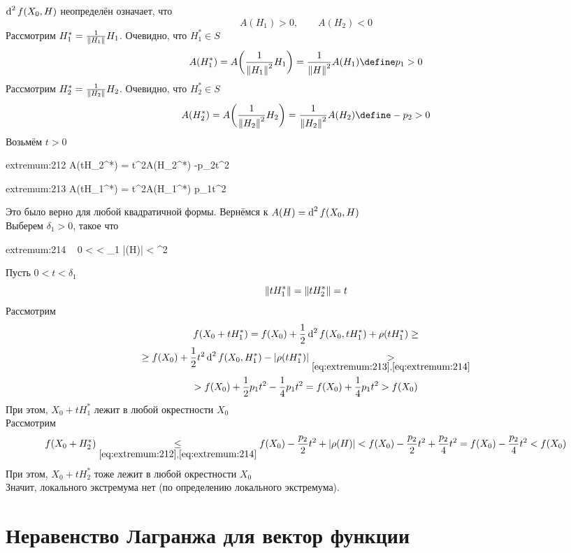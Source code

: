 \begin{eproof}
	\item $ \di[2] f(X_0, H) $ неопределён означает, что
	$$ A(H_1) > 0, \qquad A(H_2) < 0 $$
	Рассмотрим $ H_1^* = \frac1{\norm{H_1}}H_1 $. Очевидно, что $ H_1^* \in S $
	$$ A(H_1^*) = A \bigg( \frac1{\norm{H_1}^2}H_1 \bigg) = \frac1{\norm{H}^2}A(H_1) \define p_1 > 0 $$
	Рассмотрим $ H_2^* = \frac1{\norm{H_2}}H_2 $. Очевидно, что $ H_2^* \in S $
	$$ A(H_2^*) = A \bigg( \frac1{\norm{H_2}^2}H_2 \bigg) = \frac1{\norm{H_2}^2}A(H_2) \define -p_2 > 0 $$
	Возьмём $ t > 0 $
	\begin{equ}{extremum:212}
		A(tH_2^*) = t^2A(H_2^*)  -p_2t^2
	\end{equ}
	\begin{equ}{extremum:213}
		A(tH_1^*) = t^2A(H_1^*)  p_1t^2
	\end{equ}
	Это было верно для любой квадратичной формы. Вернёмся к $ A(H) = \di[2] f(X_0, H) $ \\
	Выберем $ \delta_1 > 0 $, такое что
	\begin{equ}{extremum:214}
		\forall ~ 0 <  < \delta_1 \quad |\rho(H)| <  \min{} \cdot {}^2
	\end{equ}
	Пусть $ 0 < t < \delta_1 $
	$$ \norm{tH_1^*} = \norm{tH_2^*} = t $$
	Рассмотрим
	\begin{multline*}
		f(X_0 + tH_1^*) = f(X_0) + \half \di[2] f(X_0, tH_1^*) + \rho(tH_1^*) \ge \\
		\ge f(X_0) + \half t^2 \di[2] f(X_0, H_1^*) - |\rho(tH_1^*)| \underset{\eref{extremum:213}, \eref{extremum:214}}> \\
		> f(X_0) + \half p_1t^2 - \frac14 p_1t^2 = f(X_0) + \frac14 p_1t^2 > f(X_0)
	\end{multline*}
	При этом, $ X_0 + tH_1^* $ лежит в любой окрестности $ X_0 $ \\
	Рассмотрим
	$$ f(X_0 + H_2^*) \underset{\eref{extremum:212}, \eref{extremum:214}}\le f(X_0) - \half[p_2]t^2 + |\rho(H)| < f(X_0) - \half[p_2]t^2 + \frac{p_2}4t^2 = f(X_0) - \frac{p_2}4t^2 < f(X_0) $$
	При этом, $ X_0 + tH_2^* $ тоже лежит в любой окрестности $ X_0 $ \\
	Значит, локального экстремума нет (по определению локального экстремума).
\end{eproof}

\section{Неравенство Лагранжа для вектор функции}

